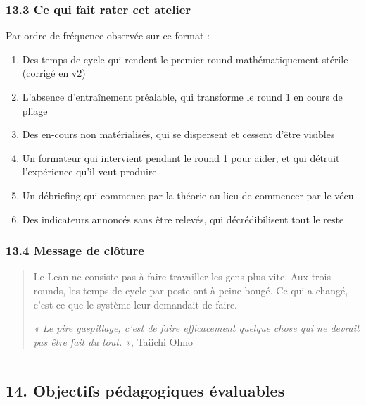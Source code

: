 \documentclass[
]{article}
\providecommand{\tightlist}{%
  \setlength{\itemsep}{0pt}\setlength{\parskip}{0pt}}
\begin{document}
\subsubsection{13.3 Ce qui fait rater cet
atelier}\label{ce-qui-fait-rater-cet-atelier}

Par ordre de fréquence observée sur ce format :

\begin{enumerate}
\def\labelenumi{\arabic{enumi}.}
\tightlist
\item
  Des temps de cycle qui rendent le premier round mathématiquement
  stérile (corrigé en v2)
\item
  L'absence d'entraînement préalable, qui transforme le round 1 en cours
  de pliage
\item
  Des en-cours non matérialisés, qui se dispersent et cessent d'être
  visibles
\item
  Un formateur qui intervient pendant le round 1 pour aider, et qui
  détruit l'expérience qu'il veut produire
\item
  Un débriefing qui commence par la théorie au lieu de commencer par le
  vécu
\item
  Des indicateurs annoncés sans être relevés, qui décrédibilisent tout
  le reste
\end{enumerate}

\subsubsection{13.4 Message de clôture}\label{message-de-cluxf4ture}

\begin{quote}
Le Lean ne consiste pas à faire travailler les gens plus vite. Aux trois
rounds, les temps de cycle par poste ont à peine bougé. Ce qui a changé,
c'est ce que le système leur demandait de faire.

\emph{« Le pire gaspillage, c'est de faire efficacement quelque chose
qui ne devrait pas être fait du tout. »}, Taiichi Ohno
\end{quote}

\begin{center}\rule{0.5\linewidth}{0.5pt}\end{center}

\subsection{14. Objectifs pédagogiques
évaluables}\label{objectifs-puxe9dagogiques-uxe9valuables}
\end{document}
